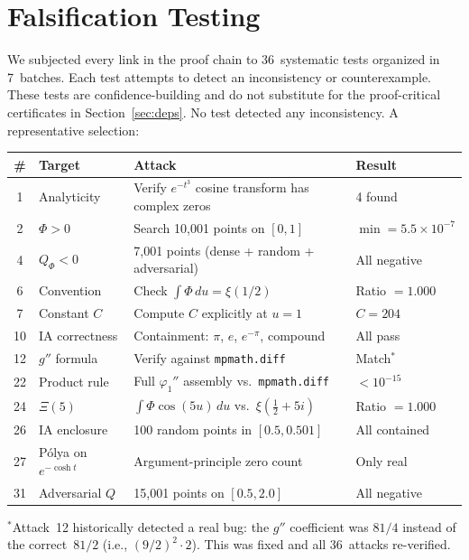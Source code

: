 \documentclass[11pt]{article}
\theoremstyle{definition}
\theoremstyle{remark}
\begin{document}
\section{Falsification Testing}
\label{sec:falsify}

We subjected every link in the proof chain to 36~systematic tests organized in 7~batches. Each test attempts to detect an inconsistency or counterexample. These tests are confidence-building and do not substitute for the proof-critical certificates in Section~\ref{sec:deps}. No test detected any inconsistency. A representative selection:

\begin{center}
\small
\begin{tabular}{clp{5.8cm}l}
\toprule
\# & Target & Attack & Result \\
\midrule
1 & Analyticity & Verify $e^{-t^3}$ cosine transform has complex zeros & 4 found \\
2 & $\Phi > 0$ & Search 10{,}001 points on $[0,1]$ & $\min = 5.5 \times 10^{-7}$ \\
4 & $Q_\Phi < 0$ & 7{,}001 points (dense + random + adversarial) & All negative \\
6 & Convention & Check $\int\Phi\,du = \xi(1/2)$ & Ratio $= 1.000$ \\
7 & Constant $C$ & Compute $C$ explicitly at $u = 1$ & $C = 204$ \\
10 & IA correctness & Containment: $\pi$, $e$, $e^{-\pi}$, compound & All pass \\
12 & $g''$ formula & Verify against \texttt{mpmath.diff} & Match$^*$ \\
22 & Product rule & Full $\varphi_1''$ assembly vs.\ \texttt{mpmath.diff} & $< 10^{-15}$ \\
24 & $\Xi(5)$ & $\int\Phi\cos(5u)\,du$ vs.\ $\xi(\tfrac{1}{2}+5i)$ & Ratio $= 1.000$ \\
26 & IA enclosure & 100 random points in $[0.5, 0.501]$ & All contained \\
27 & P\'olya on $e^{-\cosh t}$ & Argument-principle zero count & Only real \\
31 & Adversarial $Q$ & 15{,}001 points on $[0.5, 2.0]$ & All negative \\
\bottomrule
\end{tabular}
\end{center}
\noindent $^*$Attack~12 historically detected a real bug: the $g''$ coefficient was $81/4$ instead of the correct~$81/2$ (i.e., $(9/2)^2 \cdot 2$). This was fixed and all 36~attacks re-verified.
\end{document}
